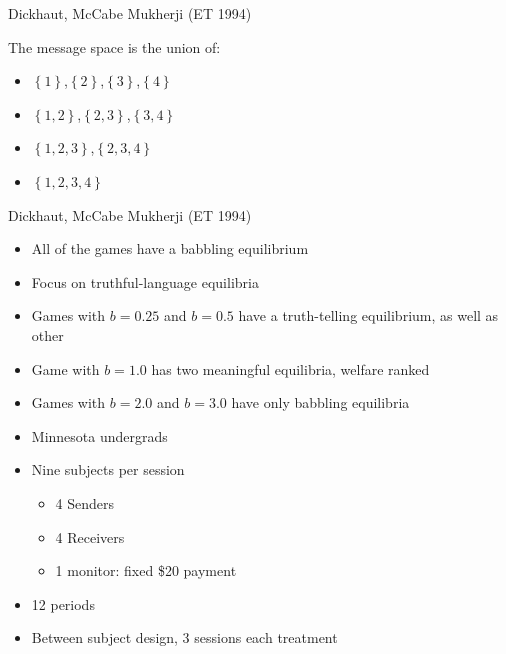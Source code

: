 \documentclass{beamer}
\begin{document}
\begin{frame}{Dickhaut, McCabe Mukherji (ET 1994)}
    \begin{card}
    The message space is the union of:
    	\begin{itemize}
    		\item $\left\{ 1\right\}$,$\left\{ 2\right\}$,$\left\{ 3\right\}$,$\left\{ 4\right\}$
    		\item $\left\{ 1,2\right\}$,$\left\{ 2,3\right\}$,$\left\{ 3,4\right\}$
    		\item $\left\{ 1,2,3\right\}$,$\left\{ 2,3,4\right\}$
    		\item $\left\{ 1,2,3,4\right\}$
    	\end{itemize}
    \end{card}
\end{frame}

\begin{frame}{Dickhaut, McCabe Mukherji (ET 1994)}
\begin{card}
    \begin{itemize}
    	\item All of the games have a babbling equilibrium
    	\item Focus on truthful-language equilibria
    	\item Games with $b=0.25$ and $b=0.5$ have a truth-telling equilibrium, as well as other
    	\item Game with $b=1.0$ has two meaningful equilibria, welfare ranked
    	\item Games with $b=2.0$ and $b=3.0$ have only babbling equilibria
    \end{itemize}
\end{card}
\end{frame}

\begin{frame}
\begin{card}
    \begin{itemize}
    	\item Minnesota undergrads
    	\item Nine subjects per session
    	\begin{itemize}
    		\item 4 Senders
    		\item 4 Receivers
    		\item 1 monitor: fixed \$20 payment
    	\end{itemize}
    	\item 12 periods
    	\item Between subject design, 3 sessions each treatment
    \end{itemize}
\end{card}
\end{frame}
\end{document}

